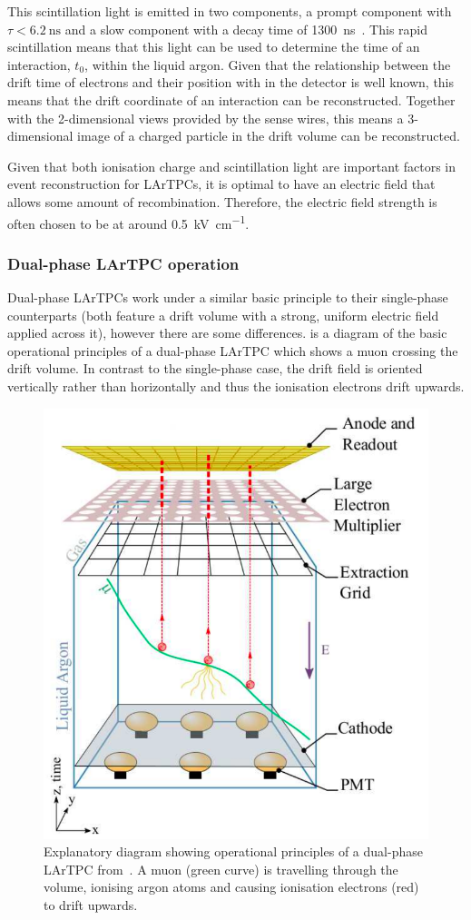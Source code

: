 This scintillation light is emitted in two components, a prompt component with $\tau < \SI{6.2}{\nano\second}$ and a slow component with a decay time of \SI{1300}{\nano\second}~\cite{argonScintillation}.
This rapid scintillation means that this light can be used to determine the time of an interaction, $t_0$, within the liquid argon.
Given that the relationship between the drift time of electrons and their position with in the detector is well known, this means that the drift coordinate of an interaction can be reconstructed.
Together with the 2-dimensional views provided by the sense wires, this means a 3-dimensional image of a charged particle in the drift volume can be reconstructed.

Given that both ionisation charge and scintillation light are important factors in event reconstruction for LArTPCs, it is optimal to have an electric field that allows some amount of recombination.
Therefore, the electric field strength is often chosen to be at around 0.5~\si{\kilo\volt\per\centi\metre}.

\subsubsection{Dual-phase LArTPC operation}
\label{sec:dune:fd:lartpc:dualphase}

Dual-phase LArTPCs work under a similar basic principle to their single-phase counterparts (both feature a drift volume with a strong, uniform electric field applied across it), however there are some differences.
 is a diagram of the basic operational principles of a dual-phase LArTPC which shows a muon crossing the drift volume.
In contrast to the single-phase case, the drift field is oriented vertically rather than horizontally and thus the ionisation electrons drift upwards.

\begin{figure}
  \centering
  \includegraphics[width=.6\linewidth]{files/figures/dune_detector/dualPhase}
  \caption[Explanatory diagram showing operational principles of a dual-phase LArTPC.]{Explanatory diagram showing operational principles of a dual-phase LArTPC from~\cite{tdrVol1}. A muon (green curve) is travelling through the volume, ionising argon atoms and causing ionisation electrons (red) to drift upwards.}
  \label{fig:dualPhase}
\end{figure}

